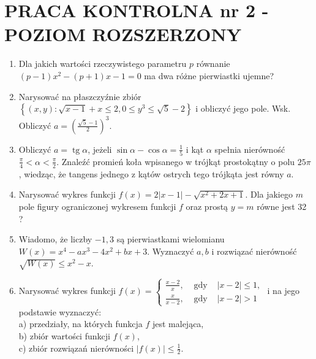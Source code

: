 \documentclass[10pt]{article}
\begin{document}
\section*{PRACA KONTROLNA nr 2 - POZIOM ROZSZERZONY}
\begin{enumerate}
  \item Dla jakich wartości rzeczywistego parametru $p$ równanie $(p-1) x^{2}-(p+1) x-1=0$ ma dwa różne pierwiastki ujemne?
  \item Narysować na płaszczyźnie zbiór $\left\{(x, y): \sqrt{x-1}+x \leqslant 2,0 \leqslant y^{3} \leqslant \sqrt{5}-2\right\}$ i obliczyć jego pole. Wsk. Obliczyć $a=\left(\frac{\sqrt{5}-1}{2}\right)^{3}$.
  \item Obliczyć $a=\operatorname{tg} \alpha$, jeżeli $\sin \alpha-\cos \alpha=\frac{1}{5}$ i kąt $\alpha$ spełnia nierówność $\frac{\pi}{4}<\alpha<\frac{\pi}{2}$. Znaleźć promień koła wpisanego w trójkąt prostokątny o polu $25 \pi$, wiedząc, że tangens jednego z kątów ostrych tego trójkąta jest równy $a$.
  \item Narysować wykres funkcji $f(x)=2|x-1|-\sqrt{x^{2}+2 x+1}$. Dla jakiego $m$ pole figury ograniczonej wykresem funkcji $f$ oraz prostą $y=m$ równe jest 32 ?
  \item Wiadomo, że liczby $-1,3$ są pierwiastkami wielomianu $W(x)=x^{4}-a x^{3}-4 x^{2}+b x+3$. Wyznaczyć $a, b$ i rozwiązać nierówność $\sqrt{W(x)} \leqslant x^{2}-x$.
  \item Narysować wykres funkcji $f(x)=\left\{\begin{array}{lll}\frac{x-2}{x}, & \text { gdy } & |x-2| \leqslant 1, \\ \frac{x}{x-2}, & \text { gdy } & |x-2|>1\end{array}\right.$ i na jego podstawie wyznaczyć:\\
a) przedziały, na których funkcja $f$ jest malejąca,\\
b) zbiór wartości funkcji $f(x)$,\\
c) zbiór rozwiązań nierówności $|f(x)| \leqslant \frac{1}{2}$.
\end{enumerate}
\end{document}
